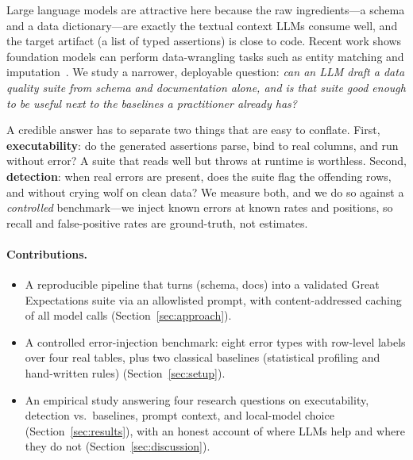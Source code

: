 \documentclass[10pt,twocolumn]{article}
\begin{document}
Large language models are attractive here because the raw ingredients---a
schema and a data dictionary---are exactly the textual context LLMs consume
well, and the target artifact (a list of typed assertions) is close to code.
Recent work shows foundation models can perform data-wrangling tasks such as
entity matching and imputation~\cite{llmdataeng}. We study a narrower, deployable
question: \emph{can an LLM draft a data quality suite from schema and
documentation alone, and is that suite good enough to be useful next to the
baselines a practitioner already has?}

A credible answer has to separate two things that are easy to conflate. First,
\textbf{executability}: do the generated assertions parse, bind to real columns,
and run without error? A suite that reads well but throws at runtime is worthless.
Second, \textbf{detection}: when real errors are present, does the suite flag the
offending rows, and without crying wolf on clean data? We measure both, and we do
so against a \emph{controlled} benchmark---we inject known errors at known rates
and positions, so recall and false-positive rates are ground-truth, not
estimates.

\paragraph{Contributions.}
\begin{itemize}
  \item A reproducible pipeline that turns (schema, docs) into a validated Great
  Expectations suite via an allowlisted prompt, with content-addressed caching
  of all model calls (Section~\ref{sec:approach}).
  \item A controlled error-injection benchmark: eight error types with row-level
  labels over four real tables, plus two classical baselines (statistical
  profiling and hand-written rules) (Section~\ref{sec:setup}).
  \item An empirical study answering four research questions on executability,
  detection vs.\ baselines, prompt context, and local-model choice
  (Section~\ref{sec:results}), with an honest account of where LLMs help and
  where they do not (Section~\ref{sec:discussion}).
\end{itemize}

\end{document}
